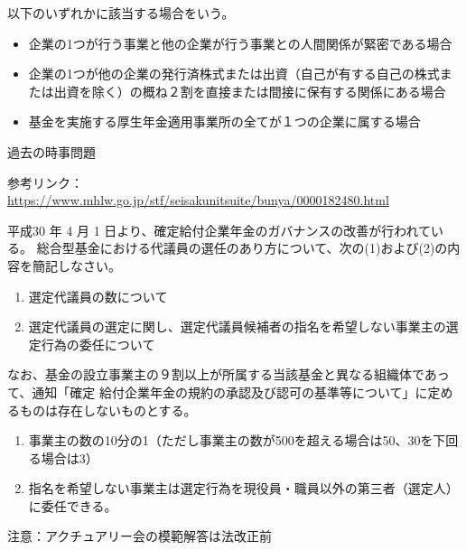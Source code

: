 \begin{answerbox}
  以下のいずれかに該当する場合をいう。
  \begin{itemize}
    \item 企業の1つが行う事業と他の企業が行う事業との人間関係が緊密である場合
    \item 企業の1つが他の企業の発行済株式または出資（自己が有する自己の株式または出資を除く）の概ね２割を直接または間接に保有する関係にある場合
    \item 基金を実施する厚生年金適用事業所の全てが１つの企業に属する場合
  \end{itemize}
\end{answerbox}

\begin{explanationbox}
  過去の時事問題

  参考リンク：\url{https://www.mhlw.go.jp/stf/seisakunitsuite/bunya/0000182480.html}
\end{explanationbox}


\begin{shortanswer}[年金1 \ 2018 \ 問題2(4)]
平成30 年 4 月 1 日より、確定給付企業年金のガバナンスの改善が行われている。
総合型基金における代議員の選任のあり方について、次の(1)および(2)の内容を簡記しなさい。
\begin{enumerate}[(1)]
  \item 選定代議員の数について
  \item 選定代議員の選定に関し、選定代議員候補者の指名を希望しない事業主の選定行為の委任について
\end{enumerate}

なお、基金の設立事業主の９割以上が所属する当該基金と異なる組織体であって、通知「確定
給付企業年金の規約の承認及び認可の基準等について」に定めるものは存在しないものとする。
\end{shortanswer}

\begin{answerbox}
  \begin{enumerate}[(1)]
    \item 事業主の数の10分の1（ただし事業主の数が500を超える場合は50、30を下回る場合は3）
    \item 指名を希望しない事業主は選定行為を現役員・職員以外の第三者（選定人）に委任できる。
  \end{enumerate}
\end{answerbox}

\begin{explanationbox}
  注意：アクチュアリー会の模範解答は法改正前
\end{explanationbox}

